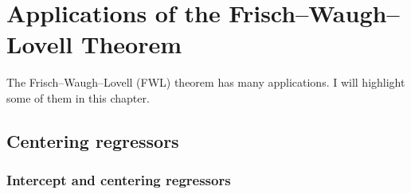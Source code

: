  
\chapter{Applications of the Frisch--Waugh--Lovell Theorem}\label{chapter::FWL-application}
 
The Frisch--Waugh--Lovell (FWL) theorem has many applications. I will highlight some of them in this chapter. 



\section{Centering regressors}

\subsection{Intercept and centering regressors}

